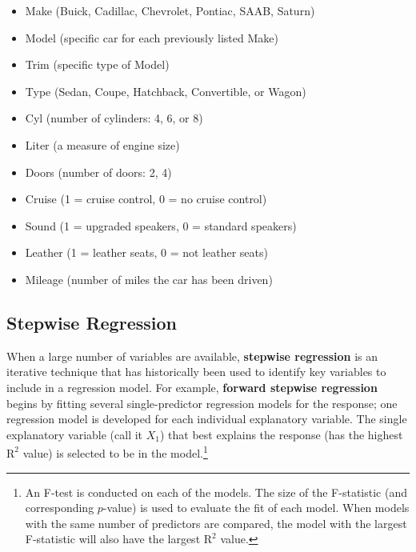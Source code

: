 \documentclass[
]{book}
\providecommand{\tightlist}{%
  \setlength{\itemsep}{0pt}\setlength{\parskip}{0pt}}
\begin{document}
\begin{itemize}
\tightlist
\item
  Make (Buick, Cadillac, Chevrolet, Pontiac, SAAB, Saturn)
\item
  Model (specific car for each previously listed Make)
\item
  Trim (specific type of Model)
\item
  Type (Sedan, Coupe, Hatchback, Convertible, or Wagon)
\item
  Cyl (number of cylinders: 4, 6, or 8)
\item
  Liter (a measure of engine size)
\item
  Doors (number of doors: 2, 4)
\item
  Cruise (1 = cruise control, 0 = no cruise control)
\item
  Sound (1 = upgraded speakers, 0 = standard speakers)
\item
  Leather (1 = leather seats, 0 = not leather seats)
\item
  Mileage (number of miles the car has been driven)
\end{itemize}

\hypertarget{stepwise-regression}{%
\subsection*{Stepwise Regression}\label{stepwise-regression}}

When a large number of variables are available, \textbf{stepwise regression} is an iterative technique that has historically been used to identify key variables to include in a regression model. For example, \textbf{forward stepwise regression} begins by fitting several single-predictor regression models for the response; one regression model is developed for each individual explanatory variable. The single explanatory variable (call it \(X_1\)) that best explains the response (has the highest \(\mathrm{R}^2\) value) is selected to be in the model.\footnote{An F-test is conducted on each of the models. The size of the F-statistic (and corresponding \(p\)-value) is used to evaluate the fit of each model. When models with the same number of predictors are compared, the model with the largest F-statistic will also have the largest \(\mathrm{R}^2\) value.}
\end{document}

